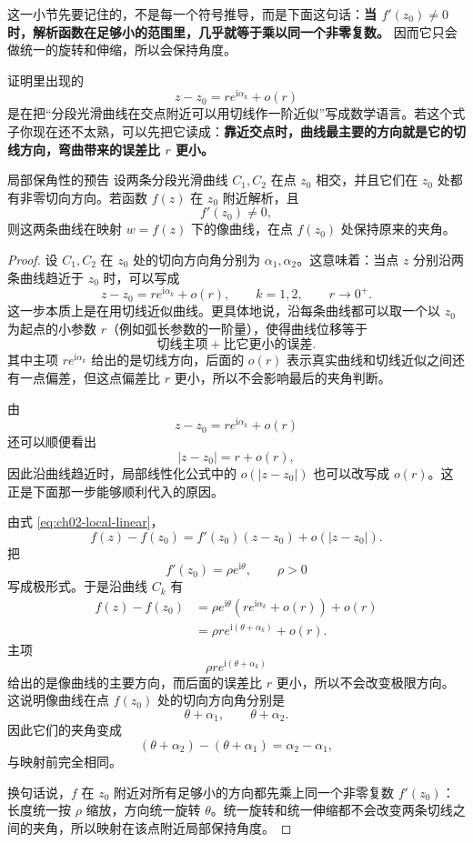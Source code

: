 \begin{tishi}
这一小节先要记住的，不是每一个符号推导，而是下面这句话：\textbf{当 $f'(z_0)\neq 0$ 时，解析函数在足够小的范围里，几乎就等于乘以同一个非零复数。} 因而它只会做统一的旋转和伸缩，所以会保持角度。

证明里出现的
\[
    z-z_0=re^{\mathrm{i}\alpha_k}+o(r)
\]
是在把``分段光滑曲线在交点附近可以用切线作一阶近似''写成数学语言。若这个式子你现在还不太熟，可以先把它读成：\textbf{靠近交点时，曲线最主要的方向就是它的切线方向，弯曲带来的误差比 $r$ 更小。}
\end{tishi}

\begin{dingli}{局部保角性的预告}{}
设两条分段光滑曲线 $C_1,C_2$ 在点 $z_0$ 相交，并且它们在 $z_0$ 处都有非零切向方向。若函数 $f(z)$ 在 $z_0$ 附近解析，且
\[
    f'(z_0)\neq 0,
\]
则这两条曲线在映射 $w=f(z)$ 下的像曲线，在点 $f(z_0)$ 处保持原来的夹角。
\end{dingli}

\begin{proof}
设 $C_1,C_2$ 在 $z_0$ 处的切向方向角分别为 $\alpha_1,\alpha_2$。这意味着：当点 $z$ 分别沿两条曲线趋近于 $z_0$ 时，可以写成
\[
    z-z_0=re^{\mathrm{i}\alpha_k}+o(r),\qquad k=1,2,\qquad r\to 0^+.
\]
这一步本质上是在用切线近似曲线。更具体地说，沿每条曲线都可以取一个以 $z_0$ 为起点的小参数 $r$（例如弧长参数的一阶量），使得曲线位移等于
\[
    \text{切线主项}+\text{比它更小的误差}.
\]
其中主项 $re^{\mathrm{i}\alpha_k}$ 给出的是切线方向，后面的 $o(r)$ 表示真实曲线和切线近似之间还有一点偏差，但这点偏差比 $r$ 更小，所以不会影响最后的夹角判断。

由
\[
    z-z_0=re^{\mathrm{i}\alpha_k}+o(r)
\]
还可以顺便看出
\[
    |z-z_0|=r+o(r),
\]
因此沿曲线趋近时，局部线性化公式中的 $o(|z-z_0|)$ 也可以改写成 $o(r)$。这正是下面那一步能够顺利代入的原因。

由式 \eqref{eq:ch02-local-linear}，
\[
    f(z)-f(z_0)=f'(z_0)(z-z_0)+o(|z-z_0|).
\]
把
\[
    f'(z_0)=\rho e^{\mathrm{i}\theta},\qquad \rho>0
\]
写成极形式。于是沿曲线 $C_k$ 有
\begin{align*}
    f(z)-f(z_0)
    &=\rho e^{\mathrm{i}\theta}\left(re^{\mathrm{i}\alpha_k}+o(r)\right)+o(r)\\
    &=\rho r e^{\mathrm{i}(\theta+\alpha_k)}+o(r).
\end{align*}
主项
\[
    \rho r e^{\mathrm{i}(\theta+\alpha_k)}
\]
给出的是像曲线的主要方向，而后面的误差比 $r$ 更小，所以不会改变极限方向。
这说明像曲线在点 $f(z_0)$ 处的切向方向角分别是
\[
    \theta+\alpha_1,\qquad \theta+\alpha_2.
\]
因此它们的夹角变成
\[
    (\theta+\alpha_2)-(\theta+\alpha_1)=\alpha_2-\alpha_1,
\]
与映射前完全相同。

换句话说，$f$ 在 $z_0$ 附近对所有足够小的方向都先乘上同一个非零复数 $f'(z_0)$：长度统一按 $\rho$ 缩放，方向统一旋转 $\theta$。统一旋转和统一伸缩都不会改变两条切线之间的夹角，所以映射在该点附近局部保持角度。
\end{proof}

